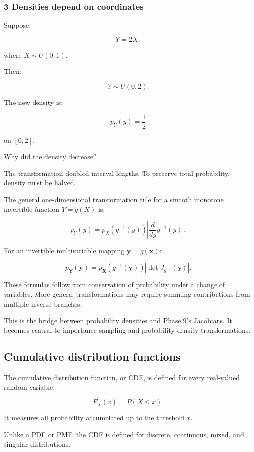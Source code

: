 \subsubsection{3 Densities depend on coordinates}\label{02-foundations-ii-ch023-densities-depend-on-coordinates}

Suppose:

\[
 Y=2X,
\]

where \(X\sim U(0,1)\).

Then:

\[
 Y\sim U(0,2).
\]

The new density is:

\[
 p_Y(y)=\frac12
\]

on \([0,2]\).

Why did the density decrease?

The transformation doubled interval lengths. To preserve total probability, density must be halved.

The general one-dimensional transformation rule for a smooth monotone invertible function \(Y=g(X)\) is:

\[
 \boxed{ p_Y(y) = p_X(g^{-1}(y)) \left| \frac{d}{dy}g^{-1}(y) \right| }.
\]

For an invertible multivariable mapping \(\mathbf y=g(\mathbf x)\):

\[
 \boxed{ p_{\mathbf Y}(\mathbf y) = p_{\mathbf X}(g^{-1}(\mathbf y)) \left| \det J_{g^{-1}}(\mathbf y) \right| }.
\]

These formulas follow from conservation of probability under a change of variables. More general transformations may require summing contributions from multiple inverse branches.

This is the bridge between probability densities and Phase 9's Jacobians. It becomes central to importance sampling and probability-density transformations.

\subsection{Cumulative distribution functions}\label{02-foundations-ii-ch023-cumulative-distribution-functions}

The cumulative distribution function, or CDF, is defined for every real-valued random variable:

\[
 \boxed{ F_X(x)=P(X\le x) }.
\]

It measures all probability accumulated up to the threshold \(x\).

Unlike a PDF or PMF, the CDF is defined for discrete, continuous, mixed, and singular distributions.

